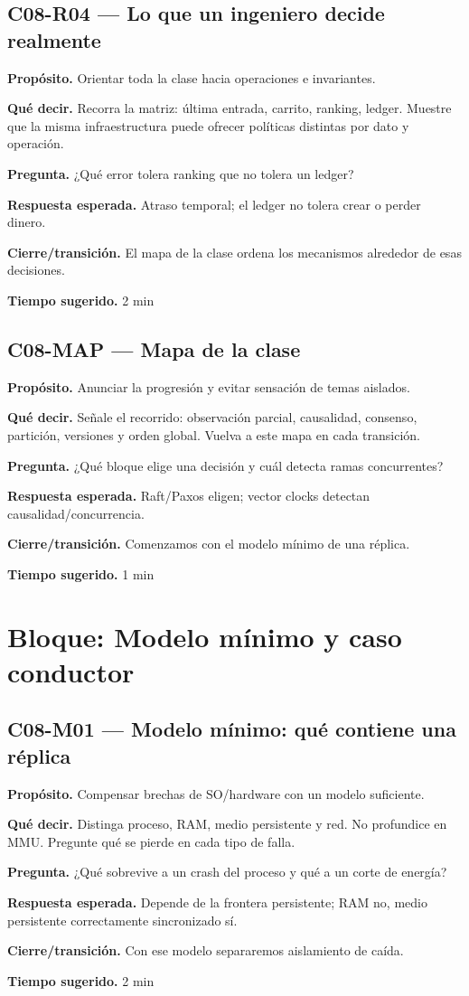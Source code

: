 \documentclass[variant=docente,cover=institutional,mode=screen]{ua-engineering-v6-article}
\newcommand{\FrameField}[2]{\par\noindent\textbf{#1.} #2\par}
\begin{document}
\subsection*{C08-R04 --- Lo que un ingeniero decide realmente}
\FrameField{Propósito}{Orientar toda la clase hacia operaciones e invariantes.}
\FrameField{Qué decir}{Recorra la matriz: última entrada, carrito, ranking, ledger. Muestre que la misma infraestructura puede ofrecer políticas distintas por dato y operación.}
\FrameField{Pregunta}{¿Qué error tolera ranking que no tolera un ledger?}
\FrameField{Respuesta esperada}{Atraso temporal; el ledger no tolera crear o perder dinero.}
\FrameField{Cierre/transición}{El mapa de la clase ordena los mecanismos alrededor de esas decisiones.}
\FrameField{Tiempo sugerido}{2 min}

\subsection*{C08-MAP --- Mapa de la clase}
\FrameField{Propósito}{Anunciar la progresión y evitar sensación de temas aislados.}
\FrameField{Qué decir}{Señale el recorrido: observación parcial, causalidad, consenso, partición, versiones y orden global. Vuelva a este mapa en cada transición.}
\FrameField{Pregunta}{¿Qué bloque elige una decisión y cuál detecta ramas concurrentes?}
\FrameField{Respuesta esperada}{Raft/Paxos eligen; vector clocks detectan causalidad/concurrencia.}
\FrameField{Cierre/transición}{Comenzamos con el modelo mínimo de una réplica.}
\FrameField{Tiempo sugerido}{1 min}

\section{Bloque: Modelo mínimo y caso conductor}

\subsection*{C08-M01 --- Modelo mínimo: qué contiene una réplica}
\FrameField{Propósito}{Compensar brechas de SO/hardware con un modelo suficiente.}
\FrameField{Qué decir}{Distinga proceso, RAM, medio persistente y red. No profundice en MMU. Pregunte qué se pierde en cada tipo de falla.}
\FrameField{Pregunta}{¿Qué sobrevive a un crash del proceso y qué a un corte de energía?}
\FrameField{Respuesta esperada}{Depende de la frontera persistente; RAM no, medio persistente correctamente sincronizado sí.}
\FrameField{Cierre/transición}{Con ese modelo separaremos aislamiento de caída.}
\FrameField{Tiempo sugerido}{2 min}
\end{document}
